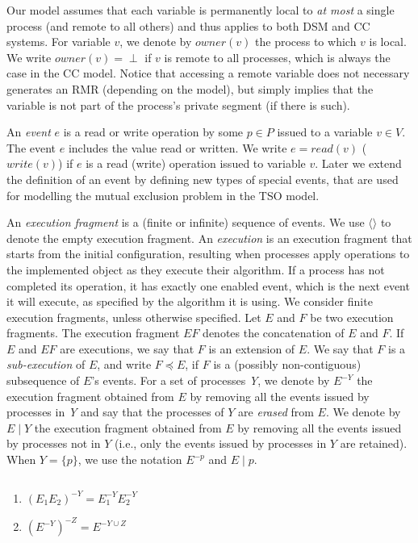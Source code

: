 Our model assumes that each variable is permanently local to \emph{at most} a single process (and remote to all others) and thus applies to both DSM and CC systems.
For variable $v$, we denote by $owner(v)$ the process to which $v$ is local. We write $owner(v) = \perp$ if $v$ is remote to all processes, which is always the case in the CC model.
Notice that accessing a remote variable does not necessary generates an RMR (depending on the model), but simply implies that the variable is not part of the process's private segment (if there is such).


An \emph{event} $e$ is a read or write operation by some $p \in P$ issued to a variable $v \in V$.
The event $e$ includes the value read or written. We write $e = read(v)$ ($write(v)$) if $e$ is a read (write)
operation issued to variable $v$. Later we extend the definition of an event by defining
new types of special events, that are used for modelling the mutual exclusion problem in the TSO model.

An \emph{execution fragment} is a (finite or infinite) sequence of events. We use $\langle \rangle$ to denote the empty execution fragment. An \emph{execution} is an execution fragment that starts from the initial configuration, resulting when processes apply operations to the implemented object as they execute their algorithm. If a process has not completed its operation, it has exactly one enabled event, which is the next event it will execute, as specified by the algorithm it is using. We consider finite execution fragments, unless otherwise specified.
Let $E$ and $F$ be two execution fragments. The execution fragment $E F$ denotes the concatenation of $E$ and $F$. If $E$ and $E F$ are executions, we say that $F$ is an extension of $E$.
We say that $F$ is a \emph{sub-execution} of $E$, and write $F \preceq E$, if $F$ is a (possibly non-contiguous)
subsequence of $E$'s events. For a set of processes \emph{Y}, we denote by $E^{-Y}$
the execution fragment obtained from $E$ by removing all the events issued by processes in \emph{Y}
and say that the processes of $Y$ are \emph{erased} from $E$. We denote by $E \mid Y$ the execution fragment obtained from $E$ by removing all the events issued by processes not in $Y$ (i.e., only the events issued by processes in $Y$ are retained). When $Y = \{p\}$, we use the notation $E^{-p}$ and $E \mid p$.

\begin{fact}
	$ $
	\begin{enumerate}
		\item $(E_1 E_2)^{-Y} = E_1^{-Y} E_2^{-Y}$
		\item $(E^{-Y})^{-Z} = E^{-Y \cup Z}$
	\end{enumerate}
\end{fact}


